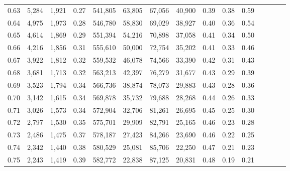 \begin{tabular}{rrrcrrrrrrrrrrr}
0.63 &   5,284 &  1,921 &                                       0.27 &  541,805 &   63,805 &   67,056 &   40,900 &  0.39 &  0.38 &                         0.59 \\
0.64 &   4,975 &  1,973 &                                       0.28 &  546,780 &   58,830 &   69,029 &   38,927 &  0.40 &  0.36 &                         0.54 \\
0.65 &   4,614 &  1,869 &                                       0.29 &  551,394 &   54,216 &   70,898 &   37,058 &  0.41 &  0.34 &                         0.50 \\
0.66 &   4,216 &  1,856 &                                       0.31 &  555,610 &   50,000 &   72,754 &   35,202 &  0.41 &  0.33 &                         0.46 \\
0.67 &   3,922 &  1,812 &                                       0.32 &  559,532 &   46,078 &   74,566 &   33,390 &  0.42 &  0.31 &                         0.43 \\
0.68 &   3,681 &  1,713 &                                       0.32 &  563,213 &   42,397 &   76,279 &   31,677 &  0.43 &  0.29 &                         0.39 \\
0.69 &   3,523 &  1,794 &                                       0.34 &  566,736 &   38,874 &   78,073 &   29,883 &  0.43 &  0.28 &                         0.36 \\
0.70 &   3,142 &  1,615 &                                       0.34 &  569,878 &   35,732 &   79,688 &   28,268 &  0.44 &  0.26 &                         0.33 \\
0.71 &   3,026 &  1,573 &                                       0.34 &  572,904 &   32,706 &   81,261 &   26,695 &  0.45 &  0.25 &                         0.30 \\
0.72 &   2,797 &  1,530 &                                       0.35 &  575,701 &   29,909 &   82,791 &   25,165 &  0.46 &  0.23 &                         0.28 \\
0.73 &   2,486 &  1,475 &                                       0.37 &  578,187 &   27,423 &   84,266 &   23,690 &  0.46 &  0.22 &                         0.25 \\
0.74 &   2,342 &  1,440 &                                       0.38 &  580,529 &   25,081 &   85,706 &   22,250 &  0.47 &  0.21 &                         0.23 \\
0.75 &   2,243 &  1,419 &                                       0.39 &  582,772 &   22,838 &   87,125 &   20,831 &  0.48 &  0.19 &                         0.21 \\

\end{tabular}
